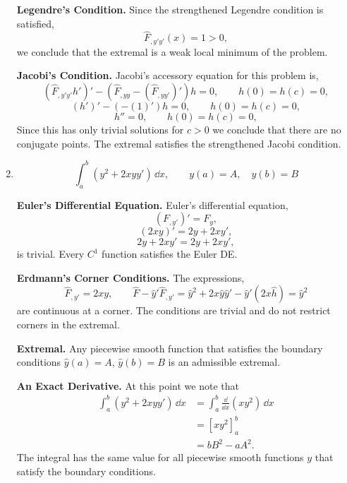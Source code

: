 \begin{Solution}
\begin{enumerate}
    \textbf{Legendre's Condition.}
    Since the strengthened Legendre condition is satisfied,
    \[
    \hat{F}_{,y' y'}(x) = 1 > 0,
    \]
    we conclude that the extremal is a weak local minimum of the problem.


    \textbf{Jacobi's Condition.}
    Jacobi's accessory equation for this problem is,
    \[
    \left( \hat{F}_{,y'y'} h' \right)' - \left( \hat{F}_{,y y} - 
      (\hat{F}_{,y y'})' \right) h = 0, \qquad
    h(0) = h(c) = 0,
    \]
    \[
    \left( h' \right)' - \left( - 
      (1)' \right) h = 0, \qquad
    h(0) = h(c) = 0,
    \]
    \[
    h'' = 0, \qquad
    h(0) = h(c) = 0,
    \]
    Since this has only trivial solutions for $c > 0$ we conclude that there
    are no conjugate points.  The extremal satisfies the strengthened Jacobi
    condition.




    \begin{center}
    \end{center}
  \item
    \[
    \int_a^b ( y^2 + 2 x y y') \,\dd x, \qquad
    y(a) = A, \quad
    y(b) = B
    \]


    \textbf{Euler's Differential Equation.}
    Euler's differential equation,
    \[
    (F_{,y'})' = F_y,
    \]
    \[
    (2 x y)' = 2 y + 2 x y',
    \]
    \[
    2 y + 2 x y' = 2 y + 2 x y',
    \]
    is trivial.  Every $C^1$ function satisfies the Euler DE.



    \textbf{Erdmann's Corner Conditions.}
    The expressions,
    \[
    \hat{F}_{,y'} = 2 x y, \qquad
    \hat{F} - \hat{y}' \hat{F}_{,y'} = \hat{y}^2 + 2 x \hat{y} \hat{y}'
    - \hat{y}' (2 x \hat{h}) = \hat{y}^2
    \]
    are continuous at a corner.  The conditions are trivial and do not restrict
    corners in the extremal.  


    \textbf{Extremal.}
    Any piecewise smooth function that satisfies the boundary conditions
    $\hat{y}(a) = A$, $\hat{y}(b) = B$ is an admissible extremal.


    \textbf{An Exact Derivative.}
    At this point we note that
    \begin{align*}
      \int_a^b (y^2 + 2 x y y') \,\dd x
      &= \int_a^b \frac{\dd}{\dd x} (x y^2) \,\dd x \\
      &= \left[ x y^2 \right]_a^b \\
      &= b B^2 - a A^2.
    \end{align*}
    The integral has the same value for all piecewise smooth functions $y$ that
    satisfy the boundary conditions.  



\end{enumerate}
\end{Solution}
